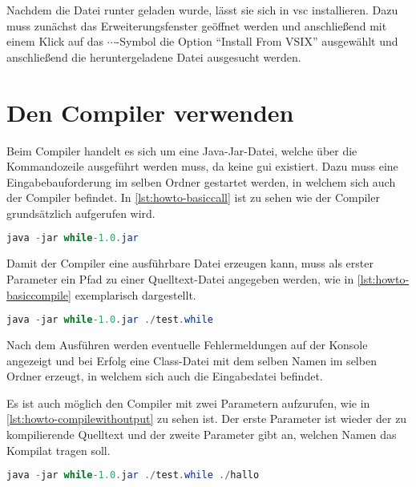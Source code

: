 Nachdem die Datei runter geladen wurde, lässt sie sich in \ac{vsc} installieren. Dazu muss zunächst das Erweiterungsfenster geöffnet werden und anschließend mit einem Klick auf das $\cdots$-Symbol die Option \enquote{Install From VSIX} ausgewählt und anschließend die heruntergeladene Datei ausgesucht werden. 


\section{Den Compiler verwenden} \label{sec:kompiler-verwenden}
Beim Compiler handelt es sich um eine Java-Jar-Datei, welche über die Kommandozeile ausgeführt werden muss, da keine \ac{gui} existiert. Dazu muss eine Eingabebauforderung im selben Ordner gestartet werden, in welchem sich auch der Compiler befindet. In \cref{lst:howto-basiccall} ist zu sehen wie der Compiler grundsätzlich aufgerufen wird.

\begin{lstlisting}[language=java, caption=Grundlegenes Aufrufen des Compilers, label={lst:howto-basiccall}]
	java -jar while-1.0.jar
\end{lstlisting}

Damit der Compiler eine ausführbare Datei erzeugen kann, muss als erster Parameter ein Pfad zu einer Quelltext-Datei angegeben werden, wie in \cref{lst:howto-basiccompile} exemplarisch dargestellt. 

\begin{lstlisting}[language=java, caption=Kompelieren einer Datei, label={lst:howto-basiccompile}]
	java -jar while-1.0.jar ./test.while
\end{lstlisting}

Nach dem Ausführen werden eventuelle Fehlermeldungen auf der Konsole angezeigt und bei Erfolg eine Class-Datei mit dem selben Namen im selben Ordner erzeugt, in welchem sich auch die Eingabedatei befindet. 

Es ist auch möglich den Compiler mit zwei Parametern aufzurufen, wie in \cref{lst:howto-compilewithoutput} zu sehen ist. Der erste Parameter ist wieder der zu kompilierende Quelltext und der zweite Parameter gibt an, welchen Namen das Kompilat tragen soll. 

\begin{lstlisting}[language=java, caption=Kompelieren einer Datei mit vorgegebener Ausgabe, label={lst:howto-compilewithoutput}]
	java -jar while-1.0.jar ./test.while ./hallo
\end{lstlisting}

